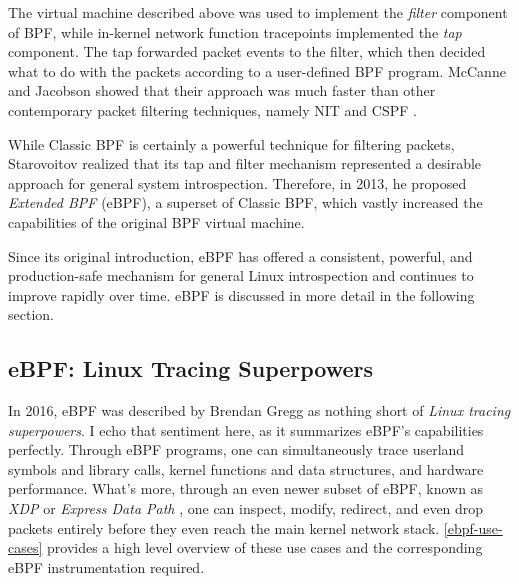 \documentclass[
  12pt]{findlay}
\begin{document}
The virtual machine described above was used to implement the
\emph{filter} component of BPF, while in-kernel network function
tracepoints implemented the \emph{tap} component. The tap forwarded
packet events to the filter, which then decided what to do with the
packets according to a user-defined BPF program. McCanne and Jacobson
showed that their approach was much faster than other contemporary
packet filtering techniques, namely NIT \autocite{nit} and CSPF
\autocite{mogul87}.

While Classic BPF is certainly a powerful technique for filtering
packets, Starovoitov \autocite{starovoitov13,starovoitov14} realized
that its tap and filter mechanism represented a desirable approach for
general system introspection. Therefore, in 2013, he proposed
\emph{Extended BPF} (eBPF), a superset of Classic BPF, which vastly
increased the capabilities of the original BPF virtual machine.

Since its original introduction, eBPF has offered a consistent,
powerful, and production-safe mechanism for general Linux introspection
and continues to improve rapidly over time. eBPF is discussed in more
detail in the following section.

\hypertarget{ebpf-linux-tracing-superpowers}{%
\subsection{eBPF: Linux Tracing
Superpowers}\label{ebpf-linux-tracing-superpowers}}

\label{ebpf-superpowers}

In 2016, eBPF was described by Brendan Gregg \autocite{gregg16} as
nothing short of \emph{Linux tracing superpowers}. I echo that sentiment
here, as it summarizes eBPF's capabilities perfectly. Through eBPF
programs, one can simultaneously trace userland symbols and library
calls, kernel functions and data structures, and hardware performance.
What's more, through an even newer subset of eBPF, known as \emph{XDP}
or \emph{Express Data Path} \autocite{xdp}, one can inspect, modify,
redirect, and even drop packets entirely before they even reach the main
kernel network stack. \autoref{ebpf-use-cases} provides a high level
overview of these use cases and the corresponding eBPF instrumentation
required.
\end{document}
